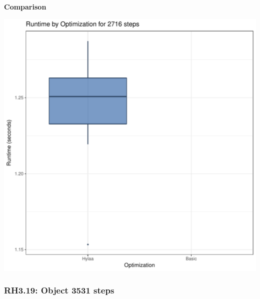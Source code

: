 \documentclass{article}\usepackage[]{graphicx}\usepackage[]{color}
\makeatletter
\def\maxwidth{ %
  \ifdim\Gin@nat@width>\linewidth
    \linewidth
  \else
    \Gin@nat@width
  \fi
}
\newenvironment{knitrout}{}{} %
\makeatother
\begin{document}
 \textbf{Comparison}
  
\begin{knitrout}
\color{fgcolor}
\includegraphics[width=\maxwidth]{figure/RH3_steps2716-1} 

\end{knitrout}


\subsubsection{RH3.19: Object 3531 steps}
\end{document}
